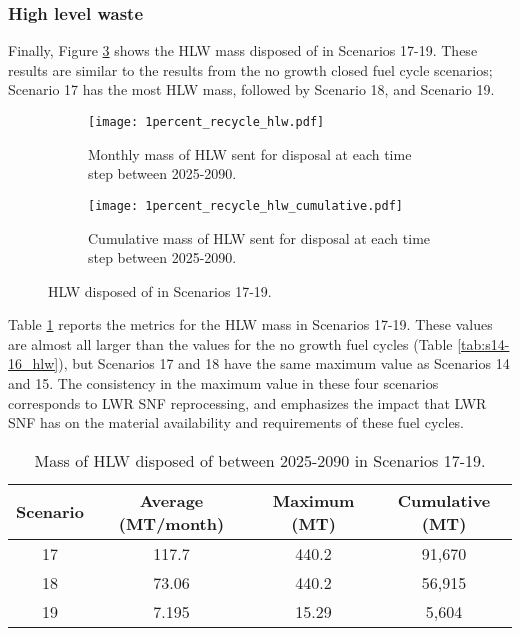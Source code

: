 \subsubsection{High level waste}
Finally, Figure \ref{fig:1percent_recycle_hlw} shows the \gls{HLW} 
mass disposed of in Scenarios 17-19. These results are similar to 
the results from the no growth closed fuel cycle scenarios; Scenario 
17 has the most \gls{HLW} mass, followed by Scenario 18, and Scenario 
19. 
\begin{figure}[h!]
    \centering
    \begin{subfigure}[b]{0.49\textwidth}
        \centering
        \texttt{[image: 1percent\_recycle\_hlw.pdf]}
        \caption{Monthly mass of HLW sent for disposal 
        at each time step between 2025-2090.}
        \label{fig:1percent_recycle_hlw_all}
    \end{subfigure}
    \hfill
    \begin{subfigure}[b]{0.49\textwidth}
        \centering
        \texttt{[image: 1percent\_recycle\_hlw\_cumulative.pdf]}
        \caption{Cumulative mass of HLW sent for disposal 
        at each time step between 2025-2090.}
        \label{fig:1percent_recycle_hlw_cumulative}
    \end{subfigure}
       \caption{\gls{HLW} disposed of in Scenarios 17-19.}
       \label{fig:1percent_recycle_hlw}
\end{figure}

Table \ref{tab:s17-19_hlw} reports the metrics for the \gls{HLW} mass 
in Scenarios 17-19. These values are almost all larger than the 
values for the no growth fuel cycles (Table \ref{tab:s14-16_hlw}), but 
Scenarios 17 and 18 have the same maximum value as Scenarios 14 and 15. The 
consistency in the maximum value in these four scenarios corresponds to 
\gls{LWR} \gls{SNF} reprocessing, and emphasizes the impact that 
\gls{LWR} \gls{SNF} has on the material availability and requirements 
of these fuel cycles. 

\begin{table}[h!]
    \centering 
    \caption{Mass of HLW disposed of between 2025-2090 in 
    Scenarios 17-19.}
    \label{tab:s17-19_hlw}
    \begin{tabular}{c c c c}
        \hline 
        Scenario & Average (MT/month) & Maximum (MT) & Cumulative (MT) \\
        \hline
        17 & 117.7 & 440.2 & 91,670 \\
        18 & 73.06 & 440.2 & 56,915 \\
        19 & 7.195 & 15.29 & 5,604 \\
        \hline
    \end{tabular}
\end{table}

